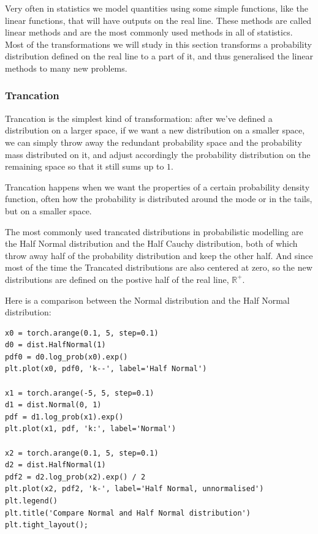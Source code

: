 \documentclass[11pt]{article}
\begin{document}
Very often in statistics we model quantities using some simple functions, like the linear functions, that will have outputs on the real line. These methods are called linear methods and are the most commonly used methods in all of statistics. Most of the transformations we will study in this section transforms a probability distribution defined on the real line to a part of it, and thus generalised the linear methods to many new problems.

\subsubsection{Trancation}
\label{sec:org6061c74}

Trancation is the simplest kind of transformation: after we've defined a distribution on a larger space, if we want a new distribution on a smaller space, we can simply throw away the redundant probability space and the probability mass distributed on it, and adjust accordingly the probability distribution on the remaining space so that it still sums up to \(1\).

Trancation happens when we want the properties of a certain probability density function, often how the probability is distributed around the mode or in the tails, but on a smaller space.

The most commonly used trancated distributions in probabilistic modelling are the Half Normal distribution and the Half Cauchy distribution, both of which throw away half of the probability distribution and keep the other half. And since most of the time the Trancated distributions are also centered at zero, so the new distributions are defined on the postive half of the real line, \(\mathbb{R}^+\).

Here is a comparison between the Normal distribution and the Half Normal distribution:

\begin{verbatim}
x0 = torch.arange(0.1, 5, step=0.1)
d0 = dist.HalfNormal(1)
pdf0 = d0.log_prob(x0).exp()
plt.plot(x0, pdf0, 'k--', label='Half Normal')

x1 = torch.arange(-5, 5, step=0.1)
d1 = dist.Normal(0, 1)
pdf = d1.log_prob(x1).exp()
plt.plot(x1, pdf, 'k:', label='Normal')

x2 = torch.arange(0.1, 5, step=0.1)
d2 = dist.HalfNormal(1)
pdf2 = d2.log_prob(x2).exp() / 2
plt.plot(x2, pdf2, 'k-', label='Half Normal, unnormalised')
plt.legend()
plt.title('Compare Normal and Half Normal distribution')
plt.tight_layout();
\end{verbatim}
\end{document}
